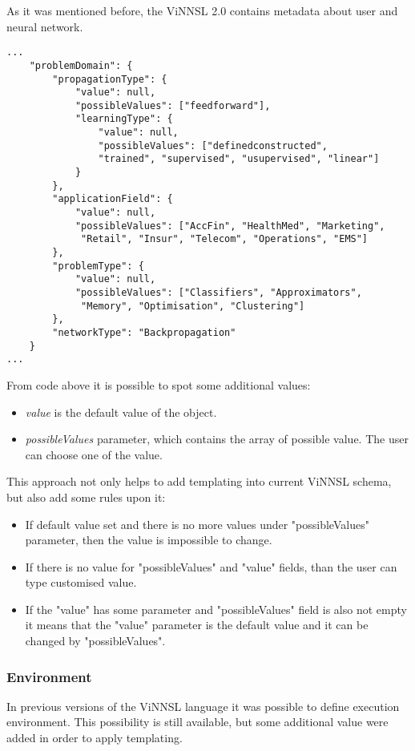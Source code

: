 As it was mentioned before, the ViNNSL 2.0 contains metadata about user and neural network.

\begin{lstlisting}
...
	"problemDomain": {
		"propagationType": {
			"value": null,
			"possibleValues": ["feedforward"],
			"learningType": {
				"value": null,
				"possibleValues": ["definedconstructed", 
				"trained", "supervised", "usupervised", "linear"]
			}
		},
		"applicationField": {
			"value": null,
			"possibleValues": ["AccFin", "HealthMed", "Marketing",
			 "Retail", "Insur", "Telecom", "Operations", "EMS"]
		},
		"problemType": {
			"value": null,
			"possibleValues": ["Classifiers", "Approximators",
			 "Memory", "Optimisation", "Clustering"]
		},
		"networkType": "Backpropagation"
	}
...
\end{lstlisting}

From code above it is possible to spot some additional values:
\begin{itemize}
\item \emph{value} is the default value of the object. 
\item \emph{possibleValues} parameter, which contains the array of possible value. The user can choose one of the value. 
\end{itemize}

This approach not only helps to add templating into current ViNNSL schema, but also add some rules upon it:
\begin{itemize}
\item If default value set and there is no more values under "possibleValues" parameter, then the value is impossible to change.
\item If there is no value for "possibleValues" and "value" fields, than the user can type customised value.
\item If the "value" has some parameter and "possibleValues" field is also not empty it means that the "value" parameter is the default value and it can be changed by "possibleValues".
\end{itemize}

\subsubsection{Environment}\label{Environment}

In previous versions of the ViNNSL language it was possible to define execution environment. This possibility is still available, but some additional value were added in order to apply templating. 

